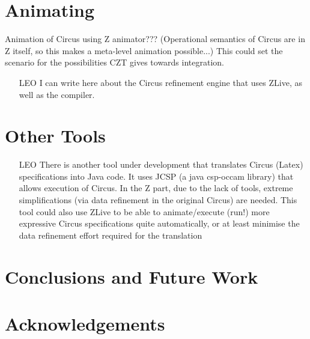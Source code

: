 \documentclass{llncs}
\begin{document}
\section{Animating}

    Animation of Circus using Z animator???
      (Operational semantics of Circus are in Z itself, so this makes a meta-level animation possible...)
    This could set the scenario for the possibilities CZT gives towards integration.

    \begin{itemize}
        \item[LEO] I can write here about the Circus refinement engine that uses ZLive, as well as the compiler.
    \end{itemize}


\section{Other Tools}

    \begin{itemize}
        \item[LEO]
        There is another tool under development that translates Circus (Latex) specifications into Java code.
        It uses JCSP (a java csp-occam library) that allows execution of Circus.
        In the Z part, due to the lack of tools, extreme simplifications (via data refinement in the original Circus)
        are needed.
        This tool could also use ZLive to be able to animate/execute (run!) more expressive Circus specifications quite
        automatically, or at least minimise the data refinement effort required for the translation
    \end{itemize}


\section{Conclusions and Future Work} \label{sec:conclusions}

\section*{Acknowledgements}



\end{document}
